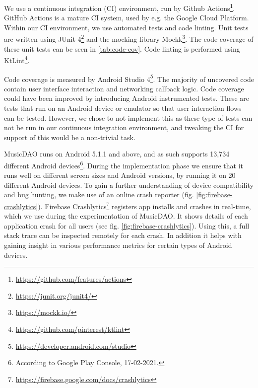 We use a continuous integration (CI) environment, run by Github Actions\footnote{\url{https://github.com/features/actions}}. GitHub Actions is a mature CI system, used by e.g. the Google Cloud Platform. Within our CI environment, we use automated tests and code linting. Unit tests are written using JUnit 4\footnote{\url{https://junit.org/junit4/}} and the mocking library Mockk\footnote{\url{https://mockk.io/}}. The code coverage of these unit tests can be seen in \ref{tab:code-cov}. Code linting is performed using KtLint\footnote{\url{https://github.com/pinterest/ktlint}}.

Code coverage is measured by Android Studio 4\footnote{\url{https://developer.android.com/studio}}. The majority of uncovered code contain user interface interaction and networking callback logic. Code coverage could have been improved by introducing Android instrumented tests. These are tests that run on an Android device or emulator so that user interaction flows can be tested. However, we chose to not implement this as these type of tests can not be run in our continuous integration environment, and tweaking the CI for support of this would be a non-trivial task.

MusicDAO runs on Android 5.1.1 and above, and as such supports 13,734 different Android devices\footnote{According to Google Play Console, 17-02-2021.}. During the implementation phase we ensure that it runs well on different screen sizes and Android versions, by running it on 20 different Android devices. To gain a further understanding of device compatibility and bug hunting, we make use of an online crash reporter (fig. \ref{fig:firebase-crashlytics}). Firebase Crashlytics\footnote{\url{https://firebase.google.com/docs/crashlytics}} registers app installs and crashes in real-time, which we use during the experimentation of MusicDAO. It shows details of each application crash for all users (see fig. \ref{fig:firebase-crashlytics}). Using this, a full stack trace can be inspected remotely for each crash. In addition it helps with gaining insight in various performance metrics for certain types of Android devices.

